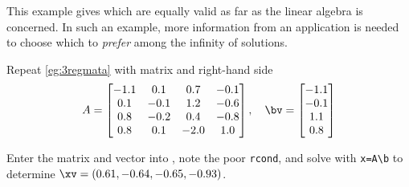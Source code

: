 This example gives  which are equally valid as far as the linear algebra is concerned.
In such an example, more information from an application is needed to choose which to \emph{prefer} among the infinity of solutions.



\begin{reduce}
\begin{example}
Repeat \cref{eg:3regmata} with matrix and right-hand side
\begin{equation*}
A=\begin{bmatrix} -1.1&0.1&0.7&-0.1
\\0.1&-0.1&1.2&-0.6
\\0.8&-0.2&0.4&-0.8
\\0.8&0.1&-2.0&1.0 \end{bmatrix},\quad
\bv=\begin{bmatrix} -1.1
\\-0.1
\\1.1
\\0.8
 \end{bmatrix}
\end{equation*}
\begin{solution} 
Enter the matrix and vector into \script, note the poor \verb|rcond|, and solve with \verb|x=A\b| to determine \(\sloppy\xv=(0.61,-0.64,-0.65,-0.93)\).
\setbox\ajrqrbox\hbox{}%
\marginajrbox%


\end{solution}
\end{example}
\end{reduce}
